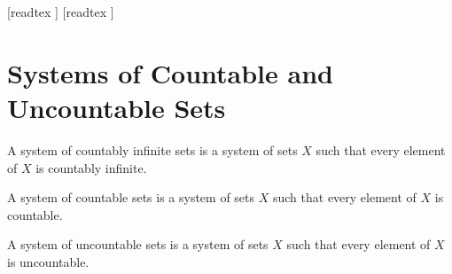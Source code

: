 \documentclass[10pt]{article}
\begin{document}
  \begin{imports}
    \begin{forthel}
      [readtex ]
      [readtex ]
    \end{forthel}
  \end{imports}


  \section*{Systems of Countable and Uncountable Sets}

  \begin{forthel}
    \begin{definition}[id=FOUNDATIONS_14_3786392159125504,printid]
      A system of countably infinite sets is a system of sets $X$ such that every element of $X$ is countably infinite.
    \end{definition}
  \end{forthel}

  \begin{forthel}
    \begin{definition}[id=FOUNDATIONS_14_7341152585908224,printid]
      A system of countable sets is a system of sets $X$ such that every element of $X$ is countable.
    \end{definition}
  \end{forthel}

  \begin{forthel}
    \begin{definition}[id=FOUNDATIONS_14_6106935677943808,printid]
      A system of uncountable sets is a system of sets $X$ such that every element of $X$ is uncountable.
    \end{definition}
  \end{forthel}
\end{document}
